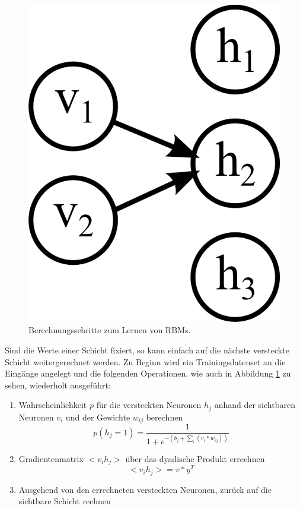 \begin{figure}
{\begin{minipage}{0.33\textwidth}
	\includegraphics[scale=1]{images/rbm-step3.png}\end{minipage}}
\caption{Berechnungsschritte zum Lernen von RBMs.}
\label{fig:rbm-steps}
\end{figure}

Sind die Werte einer Schicht fixiert, so kann einfach auf die nächste versteckte Schicht weitergerechnet werden. Zu Beginn wird ein Trainingsdatenset an die Eingänge angelegt und die folgenden Operationen, wie auch in Abbildung \ref{fig:rbm-steps} zu sehen, wiederholt ausgeführt:

\begin{enumerate}
\item Wahrscheinlichkeit $p$ für die versteckten Neuronen $h_j$ anhand der sichtbaren Neuronen $v_i$ und der Gewichte $w_{ij}$ berechnen $$p(h_j=1) = \frac{1}{1+e^{-(b_j+\sum_{i}(v_i*w_{ij}))}}$$
\item Gradientenmatrix $<v_ih_j>$ über das dyadische Produkt errechnen $$<v_ih_j> = v*y^T$$
\item Ausgehend von den errechneten versteckten Neuronen, zurück auf die sichtbare Schicht rechnen
\end{enumerate}

